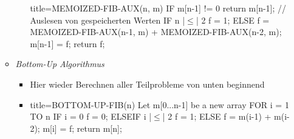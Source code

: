 \documentclass[
    12pt,
    a4paper,
    ngerman,
    color=3b,%
    marginpar=false,
    colorback=false,
    leqno,
]{tudaexercise}
\begin{document}
\begin{itemize}
\begin{itemize}
\begin{itemize}
                            \begin{ccode}[autogobble,escapeinside=||]{title={MEMOIZED-FIB-AUX(n, m)}}
                            IF m[n-1] != 0
                                return m[n-1];      // Auslesen von gespeicherten Werten
                            IF n |$\leq$| 2
                                f = 1;
                            ELSE
                                f = MEMOIZED-FIB-AUX(n-1, m) + MEMOIZED-FIB-AUX(n-2, m);
                            m[n-1] = f;
                            return f;
                            \end{ccode}
                    \end{itemize}
                \item \textit{Bottom-Up Algorithmus}
                    \begin{itemize}
                        \item Hier wieder Berechnen aller Teilprobleme von unten beginnend
                        \item[]
                            \begin{ccode}[autogobble,escapeinside=||]{title={BOTTOM-UP-FIB(n)}}
                            Let m[0...n-1] be a new array
                            FOR i = 1 TO n
                                IF i = 0
                                    f = 0;
                                ELSEIF i |$\leq$| 2
                                    f = 1;
                                ELSE
                                    f = m(i-1) + m(i-2);
                                m[i] = f;
                            return m[n];
                            \end{ccode}
                    \end{itemize}
            \end{itemize}
    \end{itemize}
\clearpage
\end{document}
